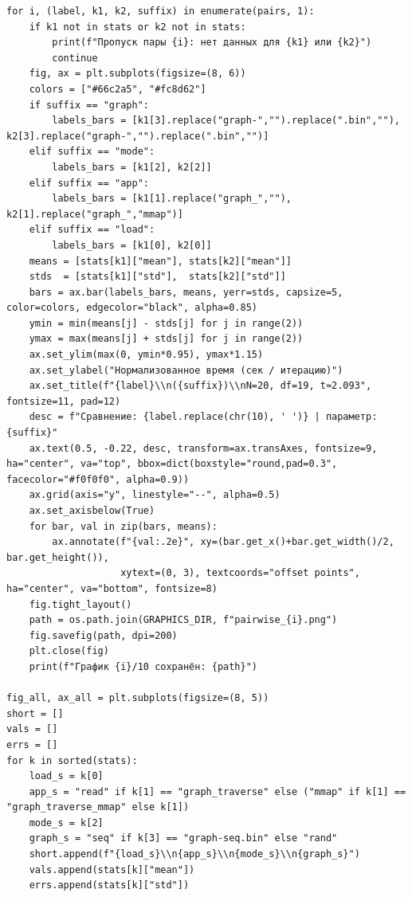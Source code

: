 \documentclass[12pt,a4paper]{article}
\begin{document}
\begin{verbatim}
for i, (label, k1, k2, suffix) in enumerate(pairs, 1):
    if k1 not in stats or k2 not in stats:
        print(f"Пропуск пары {i}: нет данных для {k1} или {k2}")
        continue
    fig, ax = plt.subplots(figsize=(8, 6))
    colors = ["#66c2a5", "#fc8d62"]
    if suffix == "graph":
        labels_bars = [k1[3].replace("graph-","").replace(".bin",""), k2[3].replace("graph-","").replace(".bin","")]
    elif suffix == "mode":
        labels_bars = [k1[2], k2[2]]
    elif suffix == "app":
        labels_bars = [k1[1].replace("graph_",""), k2[1].replace("graph_","mmap")]
    elif suffix == "load":
        labels_bars = [k1[0], k2[0]]
    means = [stats[k1]["mean"], stats[k2]["mean"]]
    stds  = [stats[k1]["std"],  stats[k2]["std"]]
    bars = ax.bar(labels_bars, means, yerr=stds, capsize=5, color=colors, edgecolor="black", alpha=0.85)
    ymin = min(means[j] - stds[j] for j in range(2))
    ymax = max(means[j] + stds[j] for j in range(2))
    ax.set_ylim(max(0, ymin*0.95), ymax*1.15)
    ax.set_ylabel("Нормализованное время (сек / итерацию)")
    ax.set_title(f"{label}\\n({suffix})\\nN=20, df=19, t≈2.093", fontsize=11, pad=12)
    desc = f"Сравнение: {label.replace(chr(10), ' ')} | параметр: {suffix}"
    ax.text(0.5, -0.22, desc, transform=ax.transAxes, fontsize=9, ha="center", va="top", bbox=dict(boxstyle="round,pad=0.3", facecolor="#f0f0f0", alpha=0.9))
    ax.grid(axis="y", linestyle="--", alpha=0.5)
    ax.set_axisbelow(True)
    for bar, val in zip(bars, means):
        ax.annotate(f"{val:.2e}", xy=(bar.get_x()+bar.get_width()/2, bar.get_height()),
                    xytext=(0, 3), textcoords="offset points", ha="center", va="bottom", fontsize=8)
    fig.tight_layout()
    path = os.path.join(GRAPHICS_DIR, f"pairwise_{i}.png")
    fig.savefig(path, dpi=200)
    plt.close(fig)
    print(f"График {i}/10 сохранён: {path}")

fig_all, ax_all = plt.subplots(figsize=(8, 5))
short = []
vals = []
errs = []
for k in sorted(stats):
    load_s = k[0]
    app_s = "read" if k[1] == "graph_traverse" else ("mmap" if k[1] == "graph_traverse_mmap" else k[1])
    mode_s = k[2]
    graph_s = "seq" if k[3] == "graph-seq.bin" else "rand"
    short.append(f"{load_s}\\n{app_s}\\n{mode_s}\\n{graph_s}")
    vals.append(stats[k]["mean"])
    errs.append(stats[k]["std"])


\end{verbatim}
\end{document}

